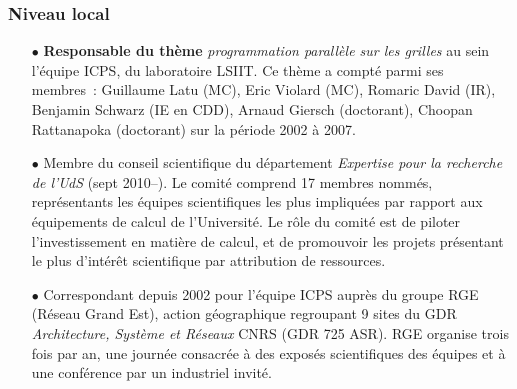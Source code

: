 \documentclass[11pt]{article}
\begin{document}


\subsubsection{Niveau local}
\begin{itemize}


\item[$\bullet$]
\textbf{Responsable du thème} \emph{programmation parallèle sur les grilles} au sein l'équipe ICPS,
du laboratoire LSIIT. Ce thème a compté parmi ses membres~: Guillaume Latu (MC), 
Eric Violard (MC), Romaric David (IR), Benjamin Schwarz (IE en CDD), Arnaud Giersch (doctorant), 
Choopan Rattanapoka (doctorant) sur la période 2002 à 2007.\\

\item [$\bullet$]
Membre du conseil scientifique du département \emph{Expertise pour la recherche de l'UdS} (sept 2010--).
Le comité comprend 17 membres nommés, représentants les équipes scientifiques les plus impliquées
par rapport aux équipements de calcul de l'Université. Le rôle du comité est de piloter
l'investissement en matière de calcul, et de promouvoir les projets présentant le plus
d'intérêt scientifique par attribution de ressources.\\

\item[$\bullet$]
Correspondant depuis 2002 pour l'équipe ICPS auprès du groupe RGE (Réseau Grand Est),
action géographique regroupant 9 sites du GDR \textit{Architecture, Système et Réseaux} 
CNRS (GDR 725 ASR). RGE organise trois fois par an, une journée consacrée à des exposés 
scientifiques des équipes et à une conférence par un industriel invité.\\


\end{itemize}
\end{document}

